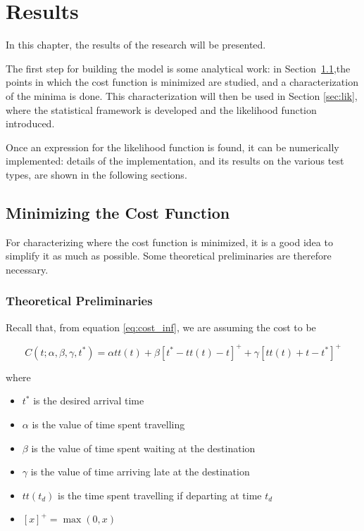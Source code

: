 \chapter{Results}
\label{chap:res}

In this chapter, the results of the research will be presented.

The first step for building the model is some analytical work:
in Section~\ref{sec:minimum},the points in which the cost function is minimized are studied,
and a characterization of the minima is done.
This characterization will then be used in Section \ref{sec:lik},
where the statistical framework is developed and the likelihood function introduced.

Once an expression for the likelihood function is found,
it can be numerically implemented:
details of the implementation, and its results on the various test types,
are shown in the following sections.

\section{Minimizing the Cost Function}
\label{sec:minimum}

For characterizing where the cost function is minimized,
it is a good idea to simplify it as much as possible.
Some theoretical preliminaries are therefore necessary.

\subsection{Theoretical Preliminaries}
\label{sec:pre_minimizing}

Recall that, from equation \eqref{eq:cost_inf}, we are assuming the cost to be

\begin{equation*}
  C(t; \alpha, \beta, \gamma, t^*) = \alpha tt(t) + \beta [t^* - tt(t) - t]^+ + \gamma[tt(t) + t - t^*]^+
\end{equation*}

where

\begin{itemize}
\item \(t^*\) is the desired arrival time
\item \(\alpha\) is the value of time spent travelling
\item \(\beta\) is the value of time spent waiting at the destination
\item \(\gamma\) is the value of time arriving late at the destination
\item \(tt(t_d)\) is the time spent travelling if departing at time \(t_d\)
\item \([x]^+ = \max(0, x)\)
\end{itemize}

